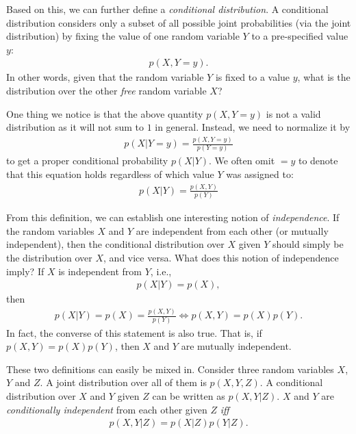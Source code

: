\documentclass{report}
\begin{document}
Based on this, we can further define a {\it conditional distribution}. A
conditional distribution considers only a subset of all possible joint
probabilities (via the joint distribution) by fixing the value of one random
variable $Y$ to a pre-specified value $y$:
\begin{align*}
    p(X, Y=y).
\end{align*}
In other words, given that the random variable $Y$ is fixed to a value $y$, what
is the distribution over the other {\it free} random variable $X$?

One thing we notice is that the above quantity $p(X, Y=y)$ is not a valid
distribution as it will not sum to $1$ in general. Instead, we need to normalize
it by 
\begin{align*}
    p(X|Y=y) = \frac{p(X, Y=y)}{p(Y=y)}
\end{align*}
to get a proper conditional probability $p(X|Y)$. We often omit $=y$ to denote
that this equation holds regardless of which value $Y$ was assigned to:
\begin{align}
    \label{eq:condprob}
    p(X|Y) = \frac{p(X, Y)}{p(Y)}
\end{align}

From this definition, we can establish one interesting notion of {\it
independence}. If the random variables $X$ and $Y$ are independent from each
other (or mutually independent), then the conditional distribution over $X$
given $Y$ should simply be the distribution over $X$, and vice versa. What does
this notion of independence imply?
If $X$ is independent from $Y$, i.e.,
\begin{align*}
    p(X|Y) = p(X),
\end{align*}
then
\begin{align}
    \label{eq:independence}
    p(X|Y) = p(X) = \frac{p(X, Y)}{p(Y)} 
    \iff p(X, Y) = p(X)p(Y).
\end{align}
In fact, the converse of this statement is also true. That is, if $p(X, Y) =
p(X)p(Y)$, then $X$ and $Y$ are mutually independent.   

These two definitions can easily be mixed in. Consider three random variables
$X$, $Y$ and $Z$. A joint distribution over all of them is $p(X, Y, Z)$. A
conditional distribution over $X$ and $Y$ given $Z$ can be written as $p(X,
Y|Z)$. $X$ and $Y$ are {\it conditionally independent} from each other given
$Z$ {\it iff} 
\begin{align}
    \label{eq:cond_ind}
    p(X,Y|Z) = p(X|Z)p(Y|Z). 
\end{align}
\end{document}
